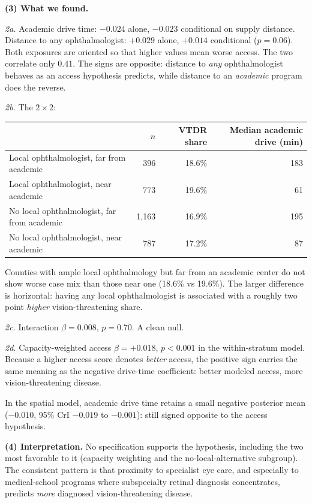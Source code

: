 \documentclass[11pt]{article}
\newcommand{\tpart}[1]{\medskip\noindent\textbf{#1}\quad}
\begin{document}
\tpart{(3) What we found.}

\emph{2a.} Academic drive time: $-0.024$ alone, $-0.023$ conditional on supply
distance. Distance to any ophthalmologist: $+0.029$ alone, $+0.014$ conditional
($p = 0.06$). Both exposures are oriented so that higher values mean worse
access. The two correlate only $0.41$. The signs are opposite:
distance to \emph{any} ophthalmologist behaves as an access hypothesis predicts,
while distance to an \emph{academic} program does the reverse.

\emph{2b.} The $2\times2$:
\begin{center}
\begin{tabular}{lrrr}
\toprule
 & $n$ & VTDR share & Median academic drive (min) \\
\midrule
Local ophthalmologist, far from academic  & 396   & 18.6\% & 183 \\
Local ophthalmologist, near academic      & 773   & 19.6\% & 61  \\
No local ophthalmologist, far from academic & 1,163 & 16.9\% & 195 \\
No local ophthalmologist, near academic   & 787   & 17.2\% & 87  \\
\bottomrule
\end{tabular}
\end{center}
Counties with ample local ophthalmology but far from an academic center do not
show worse case mix than those near one (18.6\% vs 19.6\%). The larger
difference is horizontal: having any local ophthalmologist is associated with a
roughly two point \emph{higher} vision-threatening share.

\emph{2c.} Interaction $\beta = 0.008$, $p = 0.70$. A clean null.

\emph{2d.} Capacity-weighted access $\beta = +0.018$, $p<0.001$ in the
within-stratum model. Because a higher access score denotes \emph{better}
access, the positive sign carries the same meaning as the negative drive-time
coefficient: better modeled access, more vision-threatening disease.

In the spatial model, academic drive time retains a
small negative posterior mean ($-0.010$, 95\% CrI $-0.019$ to $-0.001$): still
signed opposite to the access hypothesis.

\tpart{(4) Interpretation.}
No specification supports the hypothesis, including the two most favorable to it
(capacity weighting and the no-local-alternative subgroup). The consistent
pattern is that proximity to specialist eye care, and especially to
medical-school programs where subspecialty retinal diagnosis concentrates,
predicts \emph{more} diagnosed vision-threatening disease.
\end{document}
